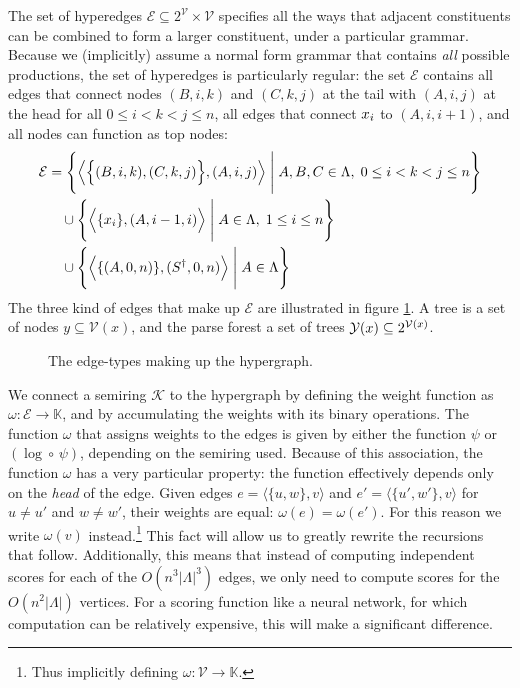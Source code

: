   The set of hyperedges $\mathcal{E} \subseteq 2^{\mathcal{V}} \times \mathcal{V}$ specifies all the ways that adjacent constituents can be combined to form a larger constituent, under a particular grammar. Because we (implicitly) assume a normal form grammar that contains \textit{all} possible productions, the set of hyperedges is particularly regular: the set $\mathcal{E}$ contains all edges that connect nodes $(B, i, k)$ and $(C, k, j)$ at the tail with $(A, i, j)$ at the head for all $0 \leq i < k < j \leq n$, all edges that connect $\x_i$ to $(A, i, i+1)$, and all nodes can function as top nodes:
  \begin{align*}
    \mathcal{E}
      &= \Bigg\{ \Big\langle \Big\{ (B, i, k), (C, k, j) \Big\},  (A, i, j) \Big\rangle \; \Bigg\vert \; A, B, C \in \Lambda, \; 0 \leq i < k < j \leq n \Bigg\}  \\
      &\quad\cup \Bigg\{ \Big\langle \{ \x_i \}, (A, i-1, i) \Big\rangle \; \Bigg\vert \; A \in \Lambda, \; 1 \leq i \leq n \Bigg\}  \\
      &\quad\cup \Bigg\{ \Big\langle \{ (A, 0, n) \}, (S^{\dagger}, 0, n) \Big\rangle \; \Bigg\vert \; A \in \Lambda \Bigg\}
  \end{align*}
  The three kind of edges that make up $\mathcal{E}$ are illustrated in figure \ref{fig:crf-edges}. A tree is a set of nodes $y \subseteq \mathcal{V}(x)$, and the parse forest a set of trees $\yieldx \subseteq 2^{\mathcal{V}(x)}$.

  \begin{figure}[h]
    \center
    \begin{tikzpicture}[scale=.6]
      
    \end{tikzpicture}
    \caption{The edge-types making up the hypergraph.}
    \label{fig:crf-edges}
  \end{figure}

  We connect a semiring $\mathcal{K}$ to the hypergraph by defining the weight function as $\omega: \mathcal{E} \to \mathbb{K}$, and by accumulating the weights with its binary operations. The function $\omega$ that assigns weights to the edges is given by either the function $\psi$ or $(\log \circ \, \psi)$, depending on the semiring used. Because of this association, the function $\omega$ has a very particular property: the function effectively depends only on the \textit{head} of the edge. Given edges $e = \langle \{ u, w \}, v \rangle$ and $e' =  \langle \{ u', w' \}, v \rangle$ for $u \neq u'$ and $w \neq w'$, their weights are equal: $\omega(e) = \omega(e')$. For this reason we write $\omega(v)$ instead.\footnote{Thus implicitly defining $\omega: \mathcal{V} \to \mathbb{K}$.} This fact will allow us to greatly rewrite the recursions that follow. Additionally, this means that instead of computing independent scores for each of the $O(n^3 \vert\Lambda\rvert^3)$ edges, we only need to compute scores for the $O(n^2 \vert\Lambda\rvert)$ vertices. For a scoring function like a neural network, for which computation can be relatively expensive, this will make a significant difference.

